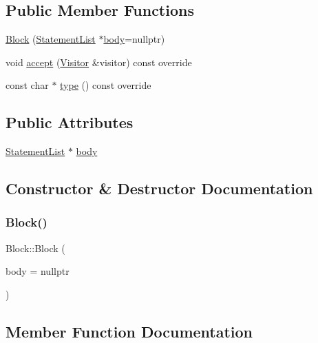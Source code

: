 \subsection*{Public Member Functions}
\begin{DoxyCompactItemize}
\item 
\hyperlink{struct_block_a757d46b60b5babb84c5c466b99679c2d}{Block} (\hyperlink{struct_statement_list}{Statement\+List} $\ast$\hyperlink{struct_block_a05207097167e9263252079d78f3d9358}{body}=nullptr)
\item 
void \hyperlink{struct_block_ac00e5c0ee8486dbdc7cb91dd5a6b34e1}{accept} (\hyperlink{struct_visitor}{Visitor} \&visitor) const override
\item 
const char $\ast$ \hyperlink{struct_block_a0a495712f07ce103494469c87a8352c2}{type} () const override
\end{DoxyCompactItemize}
\subsection*{Public Attributes}
\begin{DoxyCompactItemize}
\item 
\hyperlink{struct_statement_list}{Statement\+List} $\ast$ \hyperlink{struct_block_a05207097167e9263252079d78f3d9358}{body}
\end{DoxyCompactItemize}


\subsection{Constructor \& Destructor Documentation}
\mbox{\label{struct_block_a757d46b60b5babb84c5c466b99679c2d}} 
\subsubsection{\texorpdfstring{Block()}{Block()}}
{\footnotesize\ttfamily Block\+::\+Block (\begin{DoxyParamCaption}\item[{\hyperlink{struct_statement_list}{Statement\+List} $\ast$}]{body = {\ttfamily nullptr} }\end{DoxyParamCaption})\hspace{0.3cm}{\ttfamily [inline]}}



\subsection{Member Function Documentation}
\mbox{\label{struct_block_ac00e5c0ee8486dbdc7cb91dd5a6b34e1}} 
